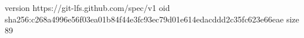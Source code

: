 version https://git-lfs.github.com/spec/v1
oid sha256:c268a4996e56f03ea01b84f44e3fc93ec79d01e614edacddd2c35fc623e66eae
size 89
